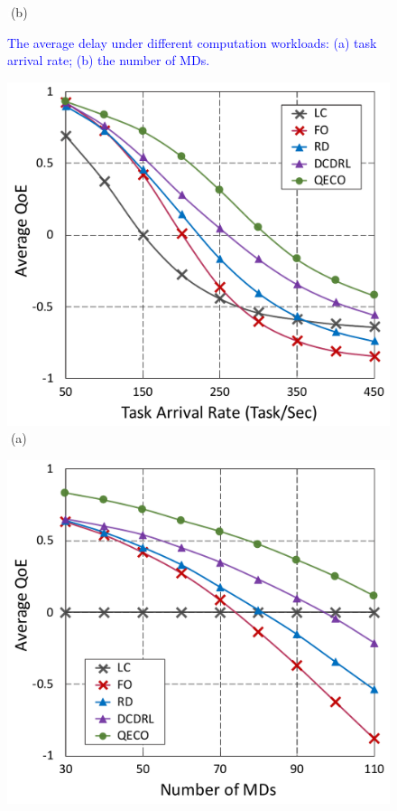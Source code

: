 \documentclass[12pt,draftclsnofoot,onecolumn]{IEEEtran}
\begin{document}
\begin{enumerate}
\begin{figure}[H]
\begin{minipage}[b]{0.33\linewidth}
		\textcolor{white}{i}\hspace{0.6cm}(b)
	\end{minipage}

	\caption{\textcolor{blue}{The average delay under different computation workloads: (a) task arrival rate; (b) the number of MDs.}}
	\label{chart3}
\end{figure} 
\begin{figure}[H]\centering
	\captionsetup{name=Fig.}
	\begin{minipage}[b]{0.33\linewidth}
		\centering
		\includegraphics[width=\textwidth]{ qoe_2} 		
		\textcolor{white}{i}\hspace{0.6cm}(a)
	\end{minipage}
	\hspace{-0.2cm}
	\begin{minipage}[b]{0.33\linewidth}
		\centering
		\includegraphics[width=\textwidth]{ qoe_1}

\end{minipage}
\end{figure}
\end{enumerate}
\end{document}
